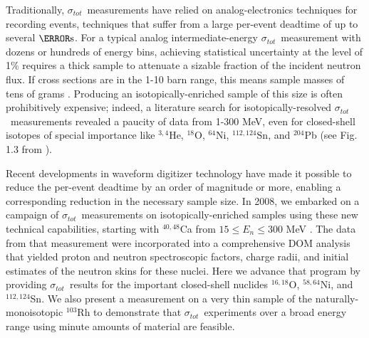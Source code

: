 \documentclass[twocolumn,secnumarabic,amssymb, nobibnotes, aps, prl,
superscriptaddress, nobalancelastpage]{revtex4}
\newcommand{\tot}{\ensuremath{\sigma_{tot}}}
\newcommand{\oEight}{\ensuremath{^{18}}O}
\newcommand{\niFour}{\ensuremath{^{64}}N\lowercase{i}}
\newcommand{\snTwelveFour}{\ensuremath{^{112,124}}S\lowercase{n}}
\begin{document}
Traditionally, \tot\ measurements have relied on analog-electronics techniques for recording
events, techniques that suffer from a large per-event deadtime of
up to several $\micro\second$. For a typical analog intermediate-energy \tot\ measurement
with dozens or hundreds of energy bins, achieving statistical uncertainty at the
level of 1\% requires a thick sample to attenuate a sizable fraction of the
incident neutron flux. If cross sections are in the 1-10 barn range, this means
sample masses of tens of grams \cite{Finlay1993, Abfalterer2001}.
Producing an isotopically-enriched sample of this size is often
prohibitively expensive; indeed, a literature search for isotopically-resolved
\tot\ measurements revealed a paucity of data from 1-300 MeV, even for
closed-shell isotopes of special importance like $^{3,4}$He, \oEight, \niFour,
\snTwelveFour, and $^{204}$Pb (see Fig. 1.3 from \cite{PruittPhDThesis}).

Recent developments in waveform digitizer technology have made it
possible to reduce the per-event deadtime by an order of magnitude or more,
enabling a corresponding reduction in the necessary sample size. In 2008, we
embarked on a campaign of \tot\ measurements on isotopically-enriched samples
using these new technical capabilities,
starting with $^{40,48}$Ca from $15 \leq E_{n} \leq 300$ MeV \cite{Shane2010}.
The data from that measurement were incorporated into a comprehensive
DOM analysis \cite{Mueller2011, Mahzoon2014,
MahzoonPhDThesis} that yielded proton and neutron spectroscopic factors, charge
radii, and initial estimates of the neutron skins \cite{Mahzoon2017}
for these nuclei.
Here we advance that program by providing \tot\ results for
the important closed-shell nuclides
$^{16,18}$O, $^{58,64}$Ni, and $^{112,124}$Sn. We also present a measurement
on a very thin sample of the naturally-monoisotopic $^{103}$Rh to demonstrate that
\tot\ experiments over a broad energy range using minute amounts of material are feasible.
\end{document}

